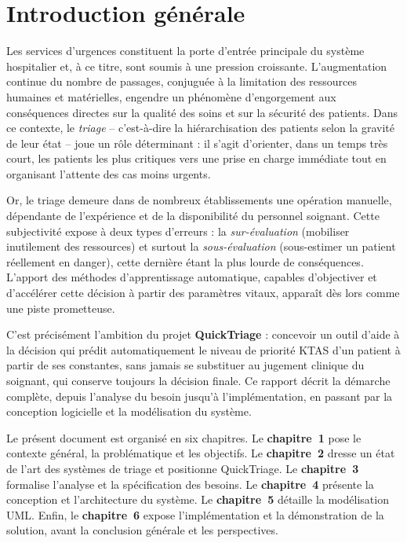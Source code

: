 \documentclass{rapportENSIAS}
\begin{document}
\newpage
\chapter*{Introduction générale}

Les services d'urgences constituent la porte d'entrée principale du système hospitalier
et, à ce titre, sont soumis à une pression croissante. L'augmentation continue du nombre
de passages, conjuguée à la limitation des ressources humaines et matérielles, engendre
un phénomène d'engorgement aux conséquences directes sur la qualité des soins et sur la
sécurité des patients. Dans ce contexte, le \textit{triage} -- c'est-à-dire la
hiérarchisation des patients selon la gravité de leur état -- joue un rôle déterminant :
il s'agit d'orienter, dans un temps très court, les patients les plus critiques vers une
prise en charge immédiate tout en organisant l'attente des cas moins urgents.

Or, le triage demeure dans de nombreux établissements une opération manuelle, dépendante
de l'expérience et de la disponibilité du personnel soignant. Cette subjectivité expose
à deux types d'erreurs : la \textit{sur-évaluation} (mobiliser inutilement des ressources)
et surtout la \textit{sous-évaluation} (sous-estimer un patient réellement en danger), cette
dernière étant la plus lourde de conséquences. L'apport des méthodes d'apprentissage
automatique, capables d'objectiver et d'accélérer cette décision à partir des paramètres
vitaux, apparaît dès lors comme une piste prometteuse.

C'est précisément l'ambition du projet \textbf{QuickTriage} : concevoir un outil d'aide
à la décision qui prédit automatiquement le niveau de priorité KTAS d'un patient à partir
de ses constantes, sans jamais se substituer au jugement clinique du soignant, qui
conserve toujours la décision finale. Ce rapport décrit la démarche complète, depuis
l'analyse du besoin jusqu'à l'implémentation, en passant par la conception logicielle et
la modélisation du système.

Le présent document est organisé en six chapitres. Le \textbf{chapitre~1} pose le contexte
général, la problématique et les objectifs. Le \textbf{chapitre~2} dresse un état de l'art
des systèmes de triage et positionne QuickTriage. Le \textbf{chapitre~3} formalise
l'analyse et la spécification des besoins. Le \textbf{chapitre~4} présente la conception et
l'architecture du système. Le \textbf{chapitre~5} détaille la modélisation UML. Enfin, le
\textbf{chapitre~6} expose l'implémentation et la démonstration de la solution, avant la
conclusion générale et les perspectives.
\end{document}

